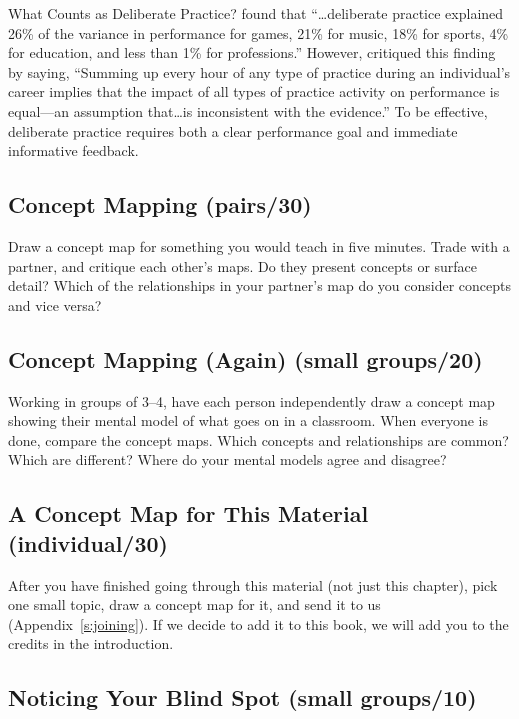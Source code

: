 \begin{aside}{What Counts as Deliberate Practice?}
  \cite{Macn2014} found that ``{\ldots}deliberate practice
  explained 26\% of the variance in performance for games, 21\% for music,
  18\% for sports, 4\% for education, and less than 1\% for professions.''
  However, \cite{Eric2016} critiqued this finding by saying, ``Summing
  up every hour of any type of practice during an individual's career
  implies that the impact of all types of practice activity on
  performance is equal---an assumption that{\ldots}is inconsistent
  with the evidence.'' To be effective, deliberate practice requires both
  a clear performance goal and immediate informative feedback.
\end{aside}


\subsection*{Concept Mapping (pairs/30)}

Draw a concept map for something you would teach in five minutes. Trade
with a partner, and critique each other's maps. Do they present concepts
or surface detail? Which of the relationships in your partner's map do
you consider concepts and vice versa?

\subsection*{Concept Mapping (Again) (small groups/20)}

Working in groups of 3--4, have each person independently draw a concept
map showing their mental model of what goes on in a classroom. When
everyone is done, compare the concept maps. Which concepts and
relationships are common? Which are different? Where do your mental
models agree and disagree?

\subsection*{A Concept Map for This Material (individual/30)}

After you have finished going through this material (not just this
chapter), pick one small topic, draw a concept map for it, and send it
to us (Appendix~\ref{s:joining}). If we decide to add it to this book, we
will add you to the credits in the introduction.

\subsection*{Noticing Your Blind Spot (small groups/10)}

